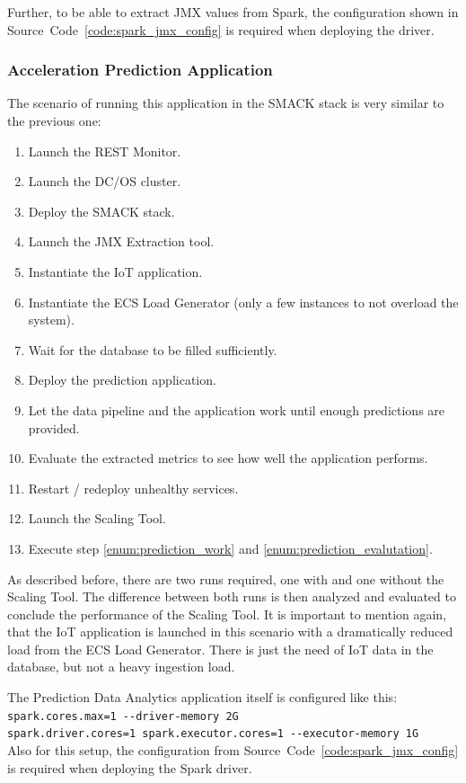 Further, to be able to extract JMX values from Spark, the configuration shown in Source~Code~\ref{code:spark_jmx_config} is required when deploying the driver.


\subsubsection{Acceleration Prediction Application}
The scenario of running this application in the SMACK stack is very similar to the previous one:

\begin{enumerate}
\item Launch the REST Monitor.
\item Launch the DC/OS cluster.
\item Deploy the SMACK stack.
\item Launch the JMX Extraction tool.
\item Instantiate the IoT application.
\item Instantiate the ECS Load Generator (only a few instances to not overload the system).
\item Wait for the database to be filled sufficiently.
\item Deploy the prediction application.
\item Let the data pipeline and the application work until enough predictions are provided. \label{enum:prediction_work}
\item Evaluate the extracted metrics to see how well the application performs. \label{enum:prediction_evalutation}
\item Restart / redeploy unhealthy services.
\item Launch the Scaling Tool.
\item Execute step \ref{enum:prediction_work} and \ref{enum:prediction_evalutation}.
\end{enumerate}

As described before, there are two runs required, one with and one without the Scaling Tool.
The difference between both runs is then analyzed and evaluated to conclude the performance of the Scaling Tool.
It is important to mention again, that the IoT application is launched in this scenario with a dramatically reduced load from the ECS Load Generator.
There is just the need of IoT data in the database, but not a heavy ingestion load.

The Prediction Data Analytics application itself is configured like this:\\
\verb|spark.cores.max=1 --driver-memory 2G|\\
\verb|spark.driver.cores=1 spark.executor.cores=1 --executor-memory 1G|\\
Also for this setup, the configuration from Source~Code~\ref{code:spark_jmx_config} is required when deploying the Spark driver.


